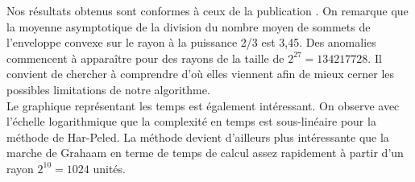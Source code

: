 Nos résultats obtenus sont conformes à ceux de la publication \cite{HarPeled98}. On remarque que la moyenne asymptotique de la division du nombre moyen de sommets de l'enveloppe convexe sur le rayon à la puissance 2/3 est 3,45. Des anomalies commencent à apparaître pour des rayons de la taille de $2^{27} = 134217728$. Il convient de chercher à comprendre d'où elles viennent afin de mieux cerner les possibles limitations de notre algorithme.\\

Le graphique représentant les temps est également intéressant. On observe avec l'échelle logarithmique que la complexité en temps est sous-linéaire pour la méthode de Har-Peled. La méthode devient d'ailleurs plus intéressante que la marche de Grahaam en terme de temps de calcul assez rapidement à partir d'un rayon $2^{10} = 1024$ unités. 



